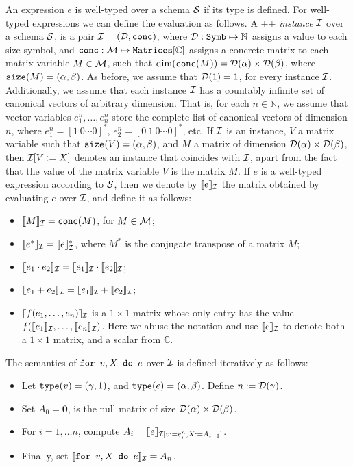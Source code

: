 An expression $e$ is well-typed over a schema $\mathcal{S}$ if its type is defined. For well-typed expressions we can define the evaluation as follows.
%
A \lang++ {\em instance} $\mathcal{I}$ over a schema $\mathcal{S}$, is a pair $\mathcal{I} = (\mathcal{D},\texttt{conc})$, where $\mathcal{D} : \texttt{Symb} \mapsto \mathbb{N}$ assigns a value to each size symbol, and $\texttt{conc} : \mathcal{M} \mapsto \texttt{Matrices}[\mathbb{C}]$ assigns a concrete matrix to each matrix variable $M\in \mathcal{M}$, such that $\dim(\texttt{conc}(M)) = \mathcal{D}(\alpha)\times \mathcal{D}(\beta)$, where $\texttt{size}(M) = (\alpha,\beta)$. As before, we assume that $\mathcal{D}(1) = 1$, for every instance $\mathcal{I}$. Additionally, we assume that each instance $\mathcal{I}$ has a countably infinite set of canonical vectors of arbitrary dimension. That is, for each $n\in \mathbb{N}$, we assume that vector variables $e_1^n,\ldots ,e_n^n$ store the complete list of canonical vectors of dimension $n$, where $e_1^n = [1\ 0 \cdots 0]^*$, $e_2^n = [0\ 1\ 0 \cdots 0]^*$, etc.
If $\mathcal{I}$ is an instance, $V$ a matrix variable such that $\texttt{size}(V)= (\alpha,\beta)$, and $M$ a matrix of dimension $\mathcal{D}(\alpha)\times \mathcal{D}(\beta)$, then $\mathcal{I}[V := X]$ denotes an instance that coincides with $\mathcal{I}$, apart from the fact that the value of the matrix variable $V$ is the matrix $M$. 
If $e$ is a well-typed expression according to $\mathcal{S}$, then we denote by $\llbracket e \rrbracket_{\mathcal{I}}$ the matrix obtained by evaluating $e$ over $\mathcal{I}$, and define it as follows:
\begin{itemize}
\item $\llbracket M \rrbracket_{\mathcal{I}} = \texttt{conc}(M)$, for $M\in \mathcal{M}$;
\item $\llbracket e^* \rrbracket_{\mathcal{I}} = \llbracket e \rrbracket_{\mathcal{I}}^*$, where $M^*$ is the conjugate transpose of a matrix $M$;
\item $\llbracket e_1\cdot e_2 \rrbracket_{\mathcal{I}} = \llbracket e_1 \rrbracket_{\mathcal{I}} \cdot \llbracket e_2 \rrbracket_{\mathcal{I}}$;
\item $\llbracket e_1 + e_2 \rrbracket_{\mathcal{I}} = \llbracket e_1 \rrbracket_{\mathcal{I}} + \llbracket e_2 \rrbracket_{\mathcal{I}}$;
\item $\llbracket f(e_1,\ldots ,e_n) \rrbracket_{\mathcal{I}}$ is a $1\times 1$ matrix whose only entry has the value $f(\llbracket e_1 \rrbracket_{\mathcal{I}},\ldots ,\llbracket e_n \rrbracket_{\mathcal{I}})$. Here we abuse the notation and use $\llbracket e \rrbracket_{\mathcal{I}}$ to denote both a $1\times 1$ matrix, and a scalar from $\mathbb{C}$.
\end{itemize}

The semantics of $\texttt{for }v,X \texttt{ do }e$ over $\mathcal{I}$ is defined iteratively as follows:
\begin{itemize}
\item Let $\texttt{type}(v)= (\gamma,1)$, and $\texttt{type}(e) = (\alpha,\beta)$. Define $n := \mathcal{D}(\gamma)$.
\item Set $A_0 = \mathbf{0}$, is the null matrix of size $\mathcal{D}(\alpha)\times \mathcal{D}(\beta)$.
\item For $i=1,\ldots n$, compute $A_i = \llbracket e \rrbracket_{\mathcal{I}[v := e^{n}_i, X:= A_{i-1}]}$.
\item Finally, set $\llbracket \texttt{for }v,X \texttt{ do }e \rrbracket_{\mathcal{I}} = A_{n}$.
\end{itemize}

